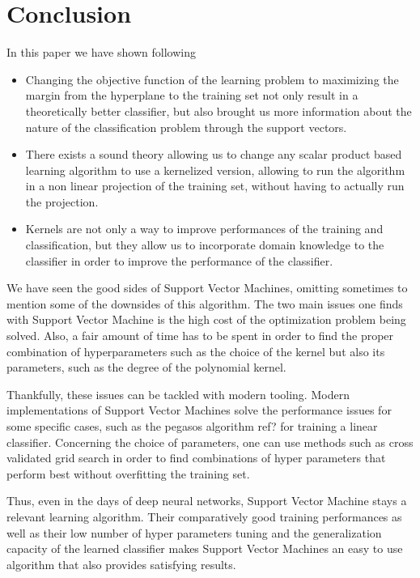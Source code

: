 \section{Conclusion}

In this paper we have shown following

\begin{itemize}
\item Changing the objective function of the learning problem to maximizing the margin from the hyperplane to the training set not only result in a theoretically better classifier, but also brought us more information about the nature of the classification problem through the support vectors.
\item There exists a sound theory allowing us to change any scalar product based learning algorithm to use a kernelized version, allowing to run the algorithm in a non linear projection of the training set, without having to actually run the projection.
\item Kernels are not only a way to improve performances of the training and classification, but they allow us to incorporate domain knowledge to the classifier in order to improve the performance of the classifier.
\end{itemize}

We have seen the good sides of Support Vector Machines, omitting sometimes to mention some of the downsides of this algorithm. The two main issues one finds with Support Vector Machine is the high cost of the optimization problem being solved. Also, a fair amount of time has to be spent in order to find the proper combination of hyperparameters such as the choice of the kernel but also its parameters, such as the degree of the polynomial kernel.

Thankfully, these issues can be tackled with modern tooling. Modern implementations of Support Vector Machines solve the performance issues for some specific cases, such as the pegasos algorithm \textcolor[rgb]{1,0,0}{ref?} for training a linear classifier. Concerning the choice of parameters, one can use methods such as cross validated grid search in order to find combinations of hyper parameters that perform best without overfitting the training set.

Thus, even in the days of deep neural networks, Support Vector Machine stays a relevant learning algorithm. Their comparatively good training performances as well as their low number of hyper parameters tuning and the generalization capacity of the learned classifier makes Support Vector Machines an easy to use algorithm that also provides satisfying results.

